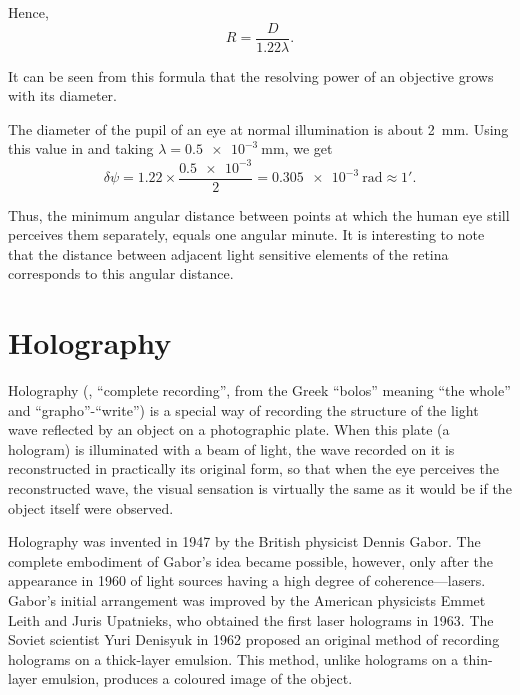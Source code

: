 \noindent
Hence,
\begin{equation}\label{eq:18_68}
	R = \frac{D}{1.22 \lambda}.
\end{equation}

\noindent
It can be seen from this formula that the resolving power of an objective grows with its diameter.

The diameter of the pupil of an eye at normal illumination is about \SI{2}{\milli\metre}.
Using this value in  and taking $\lambda = \SI{0.5e-3}{\milli\metre}$, we get
\begin{equation*}
	\delta\psi = 1.22 \times \frac{\num{0.5e-3}}{2} = \SI{0.305e-3}{\radian} \approx \ang{;1;}.
\end{equation*}

\noindent
Thus, the minimum angular distance between points at which the human eye still perceives them separately, equals one angular minute.
It is interesting to note that the distance between adjacent light sensitive elements of the retina corresponds to this angular distance.

\section{Holography}\label{sec:18_9}

Holography (\ie, ``complete recording'', from the Greek ``bolos'' meaning ``the whole'' and ``grapho''-``write'') is a special way of recording the structure of the light wave reflected by an object on a photographic plate.
When this plate (a hologram) is illuminated with a beam of light, the wave recorded on it is reconstructed in practically its original form, so that when the eye perceives the reconstructed wave, the visual sensation is virtually the same as it would be if the object itself were observed.

Holography was invented in 1947 by the British physicist Dennis Gabor.
The complete embodiment of Gabor's idea became possible, however, only after the appearance
in 1960 of light sources having a high degree of coherence---lasers.
Gabor's initial arrangement was improved by
the American physicists Emmet Leith and Juris Upatnieks, who obtained the first laser holograms in 1963.
The Soviet scientist Yuri Denisyuk in 1962 proposed an original method of recording holograms on a thick-layer emulsion.
This method, unlike holograms on a thin-layer emulsion, produces a coloured image of the object.

